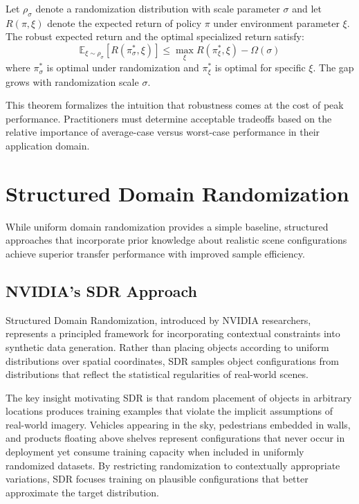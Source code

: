 \begin{theorem}
\label{thm:exploration_robustness}
Let $\rho_\sigma$ denote a randomization distribution with scale parameter $\sigma$ and let $R(\pi, \xi)$ denote the expected return of policy $\pi$ under environment parameter $\xi$. The robust expected return and the optimal specialized return satisfy:
\begin{equation}
\mathbb{E}_{\xi \sim \rho_\sigma}[R(\pi^*_\sigma, \xi)] \leq \max_\xi R(\pi^*_\xi, \xi) - \Omega(\sigma)
\end{equation}
where $\pi^*_\sigma$ is optimal under randomization and $\pi^*_\xi$ is optimal for specific $\xi$. The gap grows with randomization scale $\sigma$.
\end{theorem}

This theorem formalizes the intuition that robustness comes at the cost of peak performance. Practitioners must determine acceptable tradeoffs based on the relative importance of average-case versus worst-case performance in their application domain.

\section{Structured Domain Randomization}
\label{sec:structured_dr}

While uniform domain randomization provides a simple baseline, structured approaches that incorporate prior knowledge about realistic scene configurations achieve superior transfer performance with improved sample efficiency.

\subsection{NVIDIA's SDR Approach}

Structured Domain Randomization, introduced by NVIDIA researchers, represents a principled framework for incorporating contextual constraints into synthetic data generation. Rather than placing objects according to uniform distributions over spatial coordinates, SDR samples object configurations from distributions that reflect the statistical regularities of real-world scenes.

The key insight motivating SDR is that random placement of objects in arbitrary locations produces training examples that violate the implicit assumptions of real-world imagery. Vehicles appearing in the sky, pedestrians embedded in walls, and products floating above shelves represent configurations that never occur in deployment yet consume training capacity when included in uniformly randomized datasets. By restricting randomization to contextually appropriate variations, SDR focuses training on plausible configurations that better approximate the target distribution.

